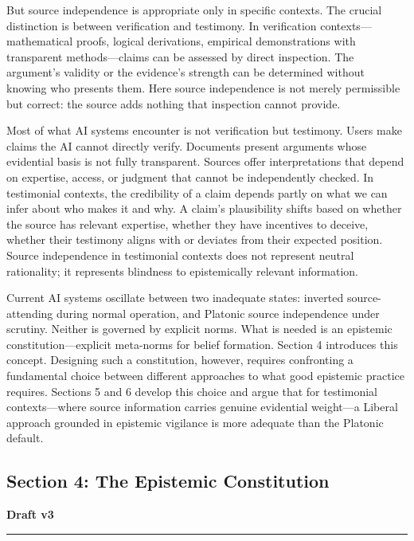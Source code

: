 But source independence is appropriate only in specific contexts. The
crucial distinction is between verification and testimony. In
verification contexts---mathematical proofs, logical derivations,
empirical demonstrations with transparent methods---claims can be
assessed by direct inspection. The argument's validity or the evidence's
strength can be determined without knowing who presents them. Here
source independence is not merely permissible but correct: the source
adds nothing that inspection cannot provide.

Most of what AI systems encounter is not verification but testimony.
Users make claims the AI cannot directly verify. Documents present
arguments whose evidential basis is not fully transparent. Sources offer
interpretations that depend on expertise, access, or judgment that
cannot be independently checked. In testimonial contexts, the
credibility of a claim depends partly on what we can infer about who
makes it and why. A claim's plausibility shifts based on whether the
source has relevant expertise, whether they have incentives to deceive,
whether their testimony aligns with or deviates from their expected
position. Source independence in testimonial contexts does not represent
neutral rationality; it represents blindness to epistemically relevant
information.

Current AI systems oscillate between two inadequate states: inverted
source-attending during normal operation, and Platonic source
independence under scrutiny. Neither is governed by explicit norms. What
is needed is an epistemic constitution---explicit meta-norms for belief
formation. Section 4 introduces this concept. Designing such a
constitution, however, requires confronting a fundamental choice between
different approaches to what good epistemic practice requires. Sections
5 and 6 develop this choice and argue that for testimonial
contexts---where source information carries genuine evidential
weight---a Liberal approach grounded in epistemic vigilance is more
adequate than the Platonic default.

\subsection{Section 4: The Epistemic
Constitution}\label{section-4-the-epistemic-constitution}

\textbf{Draft v3}

\begin{center}\rule{0.5\linewidth}{0.5pt}\end{center}

